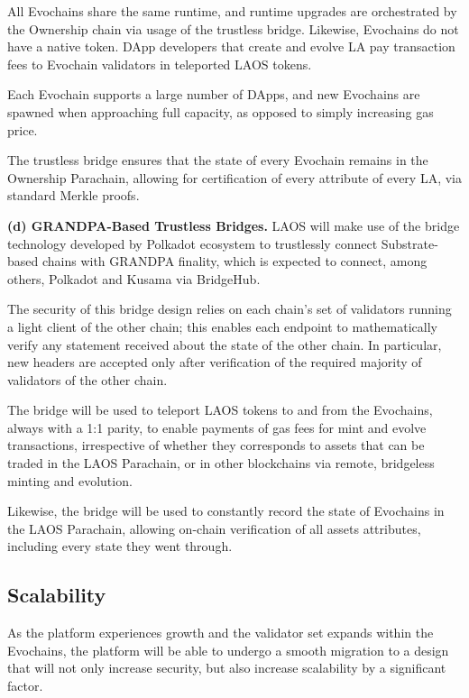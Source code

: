 All Evochains share the same runtime, and runtime upgrades are orchestrated by the Ownership chain via usage of the trustless
bridge. Likewise, Evochains do not have a native token. DApp developers that create  
and evolve LA pay transaction fees to Evochain validators in teleported LAOS tokens.

Each Evochain supports a large number of DApps, and new Evochains are spawned when approaching full capacity,
as opposed to simply increasing gas price.

The trustless bridge ensures that the state of every Evochain
remains in the Ownership Parachain, allowing for certification of
every attribute of every LA, via standard Merkle proofs.

\vspace{\baselineskip}

{\bf (d) GRANDPA-Based Trustless Bridges.}
LAOS will make use of the bridge technology developed 
by Polkadot ecosystem to trustlessly connect Substrate-based 
chains with GRANDPA finality\cite{parity-bridges},
which is expected to connect, among others,
Polkadot and Kusama via BridgeHub\cite{bridgehub}.

The security of this bridge design relies on each chain's set of validators
running a light client of the other chain; this enables each endpoint to     
mathematically verify any statement received about 
the state of the other chain. In particular, new headers are accepted only
after verification of the required majority of validators of the other chain.

The bridge will be used to teleport LAOS tokens to and from the Evochains,
always with a 1:1 parity, to enable payments of gas fees for 
mint and evolve transactions, irrespective of whether they corresponds
to assets that can be traded in the LAOS Parachain, or in other
blockchains via remote, bridgeless minting and evolution.

Likewise, the bridge will be used to constantly record the state of Evochains
in the LAOS Parachain, allowing on-chain verification of all assets
attributes, including every state they went through.


\subsection{Scalability} \label{sec:architecture-future}

As the platform experiences growth and the validator set expands
within the Evochains, the platform will be able to undergo a 
smooth migration to a design that will not only increase security,
but also increase scalability by a significant factor.

